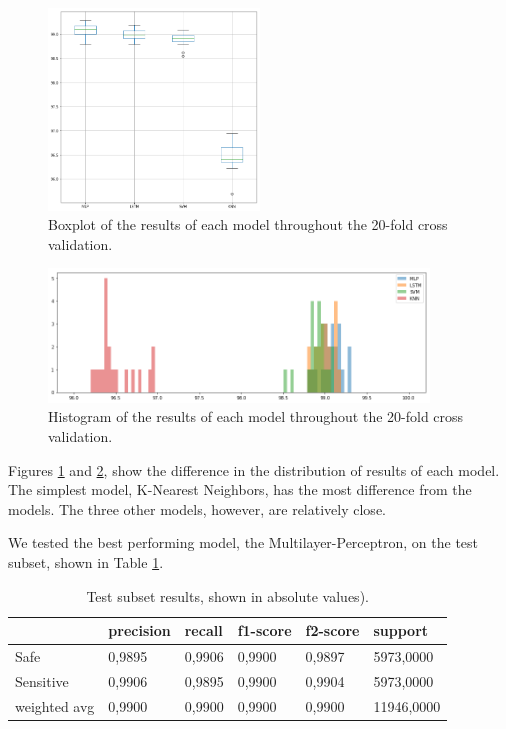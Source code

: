\begin{figure}[!ht]
    \centering
    \includegraphics[width=0.5\textwidth]{img/results/boxplot.png}
    \caption{Boxplot of the results of each model throughout the 20-fold cross validation.}
    \label{fig:results-boxplot}
\end{figure}

\begin{figure}[!ht]
    \centering
    \includegraphics[width=0.9\textwidth]{img/results/histogram.png}
    \caption{Histogram of the results of each model throughout the 20-fold cross validation.}
    \label{fig:results-histogram}
\end{figure}

Figures \ref{fig:results-boxplot} and \ref{fig:results-histogram}, show the difference in the distribution of results of each model. The simplest model, K-Nearest Neighbors, has the most difference from the models. The three other models, however, are relatively close.

We tested the best performing model, the Multilayer-Perceptron, on the test subset, shown in Table \ref{tab:test-general-results}. 

\begin{table}[!ht]
\centering
\caption{Test subset results, shown in absolute values).}
\begin{tabular}{l|l|l|l|l|l}
             & precision & recall & f1-score & f2-score & support                         \\ \hline
Safe         & 0,9895    & 0,9906 & 0,9900   & 0,9897   & 5973,0000                       \\ \hline
Sensitive    & 0,9906    & 0,9895 & 0,9900   & 0,9904   & 5973,0000                       \\ \hline
weighted avg & 0,9900    & 0,9900 & 0,9900   & 0,9900   & \multicolumn{1}{l}{11946,0000}
\end{tabular}
\label{tab:test-general-results}
\end{table}

